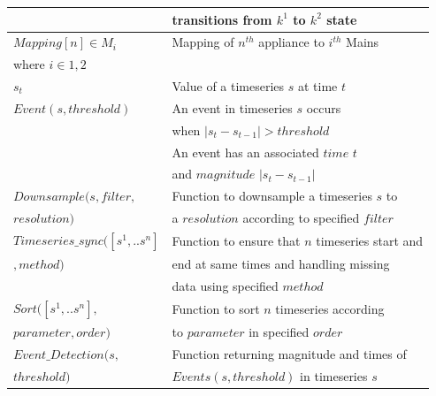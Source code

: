 \documentclass[conference]{IEEEtran}
\begin{document}
\begin{table}[ht!]
\begin{tabular}{|l|l|}
& transitions from $k^1$ to $k^2$ state\\[0.1cm]
\hline
$Mapping[n] \in {M_i}$ & Mapping of $n^{th}$ appliance to $i^{th}$ Mains\\[0.1cm]
where $i \in {1,2}$ & \\
\hline 
$s_t$ & Value of a timeseries $s$ at time $t$ \\
\hline
$Event(s,threshold)$ & An event in timeseries $s$ occurs \\
&when $|s_t-s_{t-1}|>threshold$\\
& An event has an associated $time$ $t$\\
& and $magnitude$ $|s_t-s_{t-1}|$\\
\hline
\hline
$Downsample(s,filter,$ & Function to downsample a timeseries $s$ to\\[0.1cm]
$resolution)$                                        & a $resolution$ according to specified $filter$\\[0.1cm]
\hline
$Timeseries\_sync([s^1,..s^n]$ & Function to ensure that $n$ timeseries start and\\[0.1cm]
$,method)$                                        &end at same times and handling missing\\[0.1cm]
                                        & data using specified $method$\\[0.1cm]
\hline                                        
$Sort([s^1,..s^n],$ & Function to sort $n$ timeseries according\\[0.1cm]
$parameter,order)$  &to $parameter$ in specified $order$\\[0.1cm]
\hline
$Event\_Detection(s,$ & Function returning magnitude and times of \\[0.1cm]
$threshold)$                  &$Events(s,threshold)$ in timeseries $s$\\[0.1cm]


\end{tabular}
\end{table}
\end{document}
